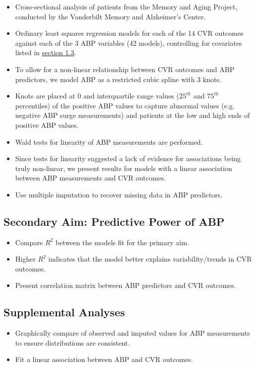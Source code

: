 \documentclass[10pt]{article}\usepackage[]{graphicx}\usepackage[]{color}
\begin{document}
\begin{itemize}
  \item Cross-sectional analysis of patients from the Memory and Aging Project, conducted by the Vanderbilt Memory and Alzheimer's Center.
  \item Ordinary least squares regression models for each of the 14 CVR outcomes against each of the 3 ABP variables (42 models), controlling for covariates listed in \hyperref[sec:vars]{section 1.3}.
  \item To allow for a non-linear relationship between CVR outcomes and ABP predictors, we model ABP as a restricted cubic spline with 3 knots. 
  \item Knots are placed at 0 and interquartile range values ($25^{th}$ and $75^{th}$ percentiles) of the positive ABP values to capture abnormal values (e.g. negative ABP surge measurements) and patients at the low and high ends of positive ABP values.
  \item Wald tests for linearity of ABP measurements are performed. 
  \item Since tests for linearity suggested a lack of evidence for associations being truly non-linear, we present results for models with a linear association between ABP measurements and CVR outcomes.
  \item Use multiple imputation to recover missing data in ABP predictors.
\end{itemize}


\subsection{Secondary Aim: Predictive Power of ABP}

\begin{itemize}
  \item Compare $R^2$ between the models fit for the primary aim.
  \item Higher $R^2$ indicates that the model better explains variability/trends in CVR outcomes.
  \item Present correlation matrix between ABP predictors and CVR outcomes.
\end{itemize}

\subsection{Supplemental Analyses}

\begin{itemize}
  \item Graphically compare of observed and imputed values for ABP measurements to ensure distributions are consistent.
  \item Fit a linear association between ABP and CVR outcomes.
\end{itemize}
\end{document}
